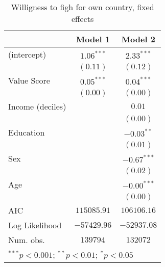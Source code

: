
\begin{table}
\begin{center}
\begin{tabular}{l c c}
\toprule
 & Model 1 & Model 2 \\
\midrule
(intercept)      & $1.06^{***}$ & $2.33^{***}$  \\
                 & $(0.11)$     & $(0.12)$      \\
Value Score      & $0.05^{***}$ & $0.04^{***}$  \\
                 & $(0.00)$     & $(0.00)$      \\
Income (deciles) &              & $0.01$        \\
                 &              & $(0.00)$      \\
Education        &              & $-0.03^{**}$  \\
                 &              & $(0.01)$      \\
Sex              &              & $-0.67^{***}$ \\
                 &              & $(0.02)$      \\
Age              &              & $-0.00^{***}$ \\
                 &              & $(0.00)$      \\
\midrule
AIC              & $115085.91$  & $106106.16$   \\
Log Likelihood   & $-57429.96$  & $-52937.08$   \\
Num. obs.        & $139794$     & $132072$      \\
\bottomrule
\multicolumn{3}{l}{\scriptsize{$^{***}p<0.001$; $^{**}p<0.01$; $^{*}p<0.05$}}
\end{tabular}
\caption{Willigness to figh for own country, fixed effects}
\label{FCregFE}
\end{center}
\end{table}
